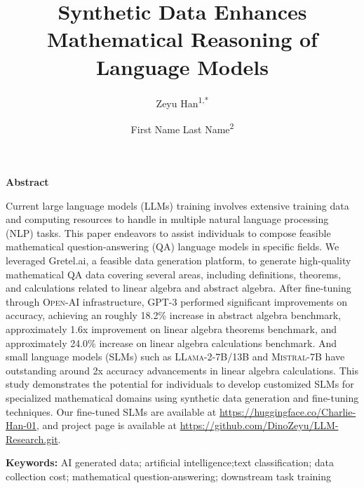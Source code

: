 \documentclass[10pt]{article}
\title{\fontsize{14pt}{16pt}\selectfont Synthetic Data Enhances Mathematical Reasoning of Language Models}
\author{
    Zeyu Han\textsuperscript{1,*} \and First Name Last Name\textsuperscript{2}
}
\begin{document}
\maketitle

\begin{center}
\begin{minipage}{0.8\textwidth}
\begin{center}
\textbf{Abstract}
\end{center}
Current large language models (LLMs) training involves extensive training data and computing resources to handle in multiple natural language processing (NLP) tasks. This paper endeavors to assist individuals to compose feasible mathematical question-answering (QA) language models in specific fields. We leveraged Gretel.ai, a feasible data generation platform, to generate high-quality mathematical QA data covering several areas, including definitions, theorems, and calculations related to linear algebra and abstract algebra. After fine-tuning through \textsc{Open-AI} infrastructure, GPT-3 performed  significant improvements on accuracy, achieving an roughly 18.2\% increase in abstract algebra benchmark, approximately 1.6x improvement on linear algebra theorems benchmark, and approximately 24.0\% increase on linear algebra calculations benchmark. And small language models (SLMs) such as \textsc{LLama-2-7B/13B} and \textsc{Mistral-7B} have outstanding around 2x accuracy advancements in linear algebra calculations. This study demonstrates the potential for individuals to develop customized SLMs for specialized mathematical domains using synthetic data generation and fine-tuning techniques. Our fine-tuned SLMs are available at \href{https://huggingface.co/Charlie-Han-01}{https://huggingface.co/Charlie-Han-01}, and project page is available at \href{https://github.com/DinoZeyu/LLM-Research.git}{https://github.com/DinoZeyu/LLM-Research.git}.
\end{minipage}
\end{center}

\begin{center}
\begin{minipage}{\textwidth}
\textbf{Keywords:} AI generated data; artificial intelligence;text classification; data collection cost; mathematical question-answering; downstream task training
\end{minipage}
\end{center}
\end{document}
